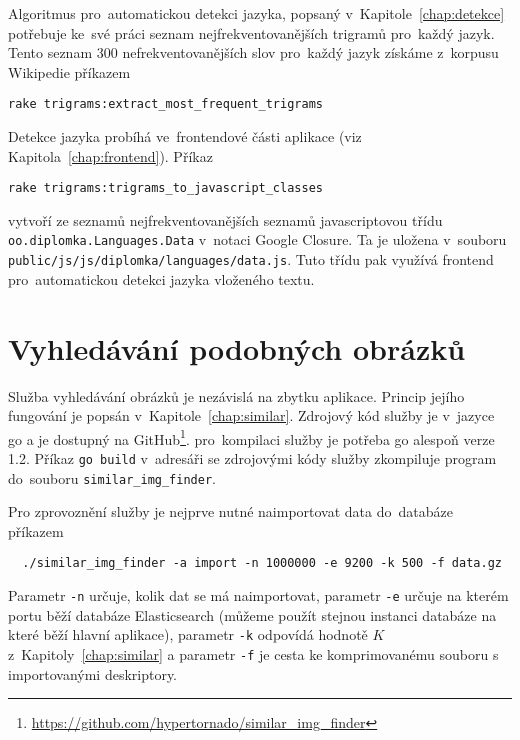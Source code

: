 Algoritmus pro~automatickou detekci jazyka, popsaný v~Kapitole~\ref{chap:detekce} potřebuje ke~své práci seznam nejfrekventovanějších trigramů pro~každý jazyk. Tento seznam $300$ nefrekventovanějších slov pro~každý jazyk získáme z~korpusu Wikipedie příkazem

\begin{lstlisting}
rake trigrams:extract_most_frequent_trigrams
\end{lstlisting}

Detekce jazyka probíhá ve~frontendové části aplikace (viz Kapitola~\ref{chap:frontend}). Příkaz

\begin{lstlisting}
rake trigrams:trigrams_to_javascript_classes
\end{lstlisting}

vytvoří ze seznamů nejfrekventovanějších seznamů javascriptovou třídu\\\lstinline{oo.diplomka.Languages.Data} v~notaci Google Closure. Ta je uložena v~souboru\\\lstinline{public/js/js/diplomka/languages/data.js}. Tuto třídu pak využívá frontend pro~automatickou detekci jazyka vloženého textu.

\section{Vyhledávání podobných obrázků}
\label{subsec:zprovozneni_podobne}

Služba vyhledávání obrázků je nezávislá na zbytku aplikace. Princip jejího fungování je popsán v~Kapitole~\ref{chap:similar}. Zdrojový kód služby je v~jazyce go a je dostupný na GitHub\footnote{\url{https://github.com/hypertornado/similar_img_finder}}. pro~kompilaci služby je potřeba go alespoň verze 1.2. Příkaz \lstinline{go build} v~adresáři se zdrojovými kódy služby zkompiluje program do~souboru \lstinline{similar_img_finder}.

Pro zprovoznění služby je nejprve nutné naimportovat data do~databáze příkazem

\begin{lstlisting}
  ./similar_img_finder -a import -n 1000000 -e 9200 -k 500 -f data.gz
\end{lstlisting}

Parametr \lstinline{-n} určuje, kolik dat se má naimportovat, parametr \lstinline{-e} určuje na kterém portu běží databáze Elasticsearch (můžeme použít stejnou instanci databáze na které běží hlavní aplikace), parametr \lstinline{-k} odpovídá hodnotě $K$ z~Kapitoly~\ref{chap:similar} a parametr \lstinline{-f} je cesta ke komprimovanému souboru s importovanými deskriptory.

